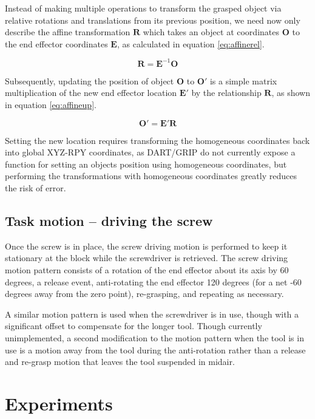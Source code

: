\documentclass[10pt, conference]{IEEEtran}
\begin{document}
   Instead of making multiple operations to transform the grasped object
   via relative rotations and translations from its previous position,
   we need now only describe the affine transformation \(\mathbf{R}\)
   which takes an object at coordinates \(\mathbf{O}\) to the end
   effector coordinates \(\mathbf{E}\), as calculated in equation
   \ref{eq:affinerel}.

   \begin{equation}\label{eq:affinerel}
   \mathbf{R} = \mathbf{E}^{-1}\mathbf{O}
   \end{equation}

   Subsequently, updating the position of object \(\mathbf{O}\) to
   \(\mathbf{O'}\) is a simple matrix multiplication of the new end
   effector location \(\mathbf{E'}\) by the relationship \(\mathbf{R}\),
   as shown in equation \ref{eq:affineup}.

   \begin{equation}\label{eq:affineup}
   \mathbf{O'} = \mathbf{E'}\mathbf{R}
   \end{equation}

   Setting the new location requires transforming the homogeneous
   coordinates back into global XYZ-RPY coordinates, as DART/GRIP do not
   currently expose a function for setting an objects position using
   homogeneous coordinates, but performing the transformations with
   homogeneous coordinates greatly reduces the risk of error.
\subsection{Task motion -- driving the screw}
\label{sec-3-6}

   Once the screw is in place, the screw driving motion is performed to
   keep it stationary at the block while the screwdriver is
   retrieved. The screw driving motion pattern consists of a rotation of
   the end effector about its axis by 60 degrees, a release event,
   anti-rotating the end effector 120 degrees (for a net -60 degrees
   away from the zero point), re-grasping, and repeating as necessary.

   A similar motion pattern is used when the screwdriver is in use,
   though with a significant offset to compensate for the longer
   tool. Though currently unimplemented, a second modification to the
   motion pattern when the tool is in use is a motion away from the tool
   during the anti-rotation rather than a release and re-grasp motion
   that leaves the tool suspended in midair.
\section{Experiments}
\label{sec-4}
\end{document}
